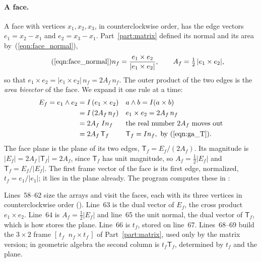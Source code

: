 \paragraph{A face.} A face with vertices $x_1, x_2, x_3$, in counterclockwise order, has the edge vectors $e_1 = x_2 - x_1$ and $e_2 = x_3 - x_1$. Part~\ref{part:matrix} defined its normal and its area by~(\ref{eqn:face_normal}),
\begin{equation*}
\tag{\ref{eqn:face_normal}}
n_f = \frac{e_1\times e_2}{|e_1\times e_2|}, \qquad A_f = \tfrac12\,|e_1\times e_2| ,
\end{equation*}
so that $e_1\times e_2 = |e_1\times e_2|\, n_f = 2A_f\, n_f$. The outer product of the two edges is the \emph{area bivector} of the face. We expand it one rule at a time:
\begin{align}
E_f = e_1\wedge e_2 &= I\,(e_1\times e_2) && a\wedge b = I(a\times b) \notag\\
&= I\,(2A_f\, n_f) && e_1\times e_2 = 2A_f\, n_f \notag\\
&= 2A_f\; I n_f && \text{the real number } 2A_f \text{ moves out} \notag\\
&= 2A_f\,\mathsf T_f && \mathsf T_f = I n_f,\ \text{by (\ref{eqn:ga_T})} . \label{eqn:r2_face_bivector}
\end{align}
The face plane is the plane of its two edges, $\mathsf T_f = E_f/(2A_f)$. Its magnitude is $|E_f| = 2A_f\,|\mathsf T_f| = 2A_f$, since $\mathsf T_f$ has unit magnitude, so $A_f = \frac12|E_f|$ and $\mathsf T_f = E_f/|E_f|$. The first frame vector of the face is its first edge, normalized, $t_f = e_1/|e_1|$; it lies in the plane already. The program computes these in :

Lines~58--62 size the arrays and visit the faces, each with its three vertices in counterclockwise order (). Line~63 is the dual vector of $E_f$, the cross product $e_1\times e_2$. Line~64 is $A_f = \frac12|E_f|$ and line~65 the unit normal, the dual vector of $\mathsf T_f$, which is how  stores the plane. Line~66 is $t_f$, stored on line~67. Lines~68--69 build the $3\times 2$ frame $[\,t_f\;\; n_f\times t_f\,]$ of Part~\ref{part:matrix}, used only by the matrix version; in geometric algebra the second column is $t_f\mathsf T_f$, determined by $t_f$ and the plane.

